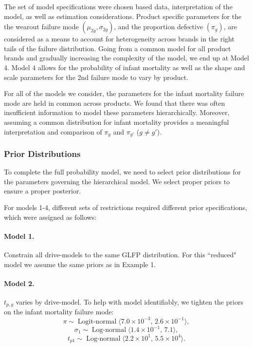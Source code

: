 \documentclass[12pt]{article}
\newcommand{\op}{\operatorname}
\begin{document}
The set of model specifications were chosen based data, interpretation of the model, as well as estimation considerations.  Product specific parameters for the the wearout failure mode $(\mu_{2g},\sigma_{2g})$, and the proportion defective $(\pi_g)$, are considered as a means to account for heterogeneity across brands in the right tails of the failure distribution.  Going from a common model for all product brands and gradually increasing the complexity of the model, we end up at Model 4.  Model 4 allows for the probability of infant mortality as well as the shape and scale parameters for the 2nd failure mode to vary by product.

For all of the models we consider, the parameters for the infant mortality failure mode are held in common across products.  We found that there was often insufficient information to model these parameters hierarchically.  Moreover, assuming a common distribution for infant mortality provides a meaningful interpretation and comparison of $\pi_g$ and $\pi_{g'}$ ($g \neq g'$). 

\subsubsection{Prior Distributions}
\label{sec:Prior Distributions}
To complete the full probability model, we need to select prior distributions for the parameters governing the hierarchical model. We select proper priors to ensure a proper posterior.

For models 1-4, different sets of restrictions required different prior specifications, which were assigned as follows:

\paragraph{Model 1.} Constrain all drive-models to the same GLFP distribution. For this ``reduced" model we assume the same priors as in Example 1.

\paragraph{Model 2.} $t_{p,g}$ varies by drive-model. To help with model identifiably, we tighten the priors on the infant mortality failure mode:
$$ \pi \sim \op{Logit-normal}\langle 7.0\times 10^{-3},\, 2.6 \times 10^{-1} \rangle,$$
$$\sigma_1 \sim \op{Log-normal}\langle 1.4 \times 10^{-1},\, 7.1\rangle,$$ 
$$t_{p1} \sim \op{Log-normal} \langle 2.2 \times 10^1,\, 5.5 \times 10^{4} \rangle.$$
\end{document}
